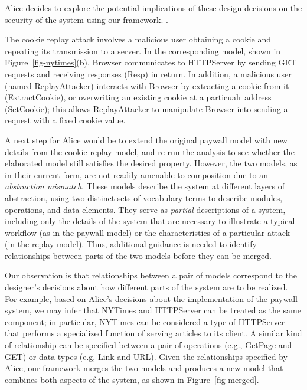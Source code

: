 Alice decides to explore the potential implications of these design
decisions on the security of the system using our framework.   .

The cookie replay attack involves a malicious user obtaining a cookie
and repeating its transmission to a server.  In the corresponding
model, shown in Figure~\ref{fig-nytimes}(b), \textsf{Browser}
communicates to \textsf{HTTPServer} by sending \textsf{GET} requests
and receiving responses (\textsf{Resp}) in return. In addition, a
malicious user (named \textsf{ReplayAttacker}) interacts with
\textsf{Browser} by extracting a cookie from it
(\textsf{ExtractCookie}), or overwriting an existing cookie at a
particualr address (\textsf{SetCookie}); this allows
\textsf{ReplayAttacker} to manipulate \textsf{Browser} into sending a
request with a fixed cookie value.

A next step for Alice would be to extend the original paywall model
with new details from the cookie replay model, and re-run the analysis
to see whether the elaborated model still satisfies the desired
property. However, the two models, as in their current form, are not
readily amenable to composition due to an \textit{abstraction
  mismatch}. These models describe the system at different layers of
abstraction, using two distinct sets of vocabulary terms to describe
modules, operations, and data elements. They serve as \textit{partial}
descriptions of a system, including only the details of the system
that are necessary to illustrate a typical workflow (as in the paywall
model) or the characteristics of a particular attack (in the replay
model). Thus, additional guidance is needed to identify relationships
between parts of the two models before they can be merged.

Our observation is that relationships between a pair of models
correspond to the designer's decisions about how different parts of
the system are to be realized. For example, based on Alice's decisions
about the implementation of the paywall system, we may infer that
\textsf{NYTimes} and \textsf{HTTPServer} can be treated as the same
component; in particular, \textsf{NYTimes} can be considered a type of
\textsf{HTTPServer} that performs a specialized function of serving
articles to its client. A similar kind of relationship can be
specified between a pair of operations (e.g., \textsf{GetPage} and
\textsf{GET}) or data types (e.g, \textsf{Link} and \textsf{URL}). Given
the relationships specified by Alice, our framework merges the two
models and produces a new model that combines both aspects of the
system, as shown in Figure~\ref{fig-merged}.

